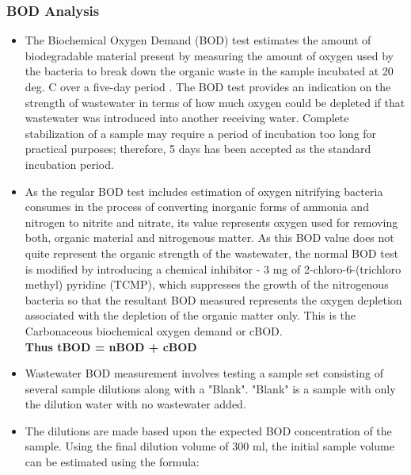 \subsubsection{BOD Analysis}
\begin{itemize}
\setlength\itemsep{1em}

\item The Biochemical Oxygen Demand (BOD) test estimates the amount of biodegradable material present by measuring the amount of oxygen used by the bacteria to break down the organic waste in the sample incubated at 20 deg. C over a five-day period . The BOD test provides an indication on the strength of wastewater in terms of how much oxygen could be depleted if that wastewater was introduced into another receiving water.  Complete stabilization of a sample may require a period of incubation too long for practical purposes; therefore, 5 days has been accepted as the standard incubation period.

\item As the regular BOD test includes estimation of oxygen nitrifying bacteria consumes in the process of converting inorganic forms of ammonia and nitrogen to nitrite and nitrate, its value represents oxygen used for removing both, organic material and nitrogenous matter.  As this BOD value does not quite represent the organic strength of the wastewater, the normal BOD test is modified by introducing a chemical inhibitor - 3 mg of 2-chloro-6-(trichloro methyl) pyridine (TCMP), which suppresses the growth of the nitrogenous bacteria so that the resultant BOD measured represents the oxygen depletion associated with the depletion of the organic matter only.  This is the Carbonaceous biochemical oxygen demand or cBOD. \\
\vspace{0.4cm}
\textbf{Thus tBOD = nBOD + cBOD}

\item Wastewater BOD measurement involves testing a sample set consisting of several sample dilutions along with a "Blank".  "Blank" is a sample with only the dilution water with no wastewater added. \\

\vspace{0.4cm}



\item The dilutions are made based upon the expected BOD concentration of the sample.  Using the final dilution volume of 300 ml, the initial sample volume can be estimated using the formula:\\
\vspace{0.4cm}


\end{itemize}
